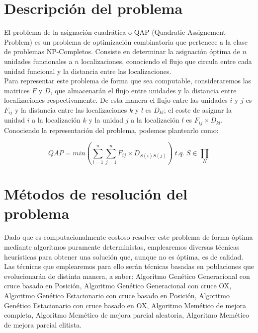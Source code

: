 \documentclass[11pt,a4paper]{article}
\begin{document}
	\newpage
	
\section{Descripción del problema}

	\noindent El problema de la asignación cuadrática o QAP (Quadratic Assignement Problem) es un problema de optimización combinatoria que pertenece a la clase de problemas NP-Completos. Consiste en determinar la asignación óptima de $n$ unidades funcionales a $n$ localizaciones, conociendo el flujo que circula entre cada unidad funcional y la distancia entre las localizaciones.\\
	
	\noindent Para representar este problema de forma que sea computable, consideraremos las matrices $F$ y $D$, que almacenarán el flujo entre unidades y la distancia entre localizaciones respectivamente. De esta manera el flujo entre las unidades $i$ y $j$ es $F_{ij}$ y la distancia entre las localizaciones $k$ y $l$ es $D_{kl}$; el coste de asignar la unidad $i$ a la localización $k$ y la unidad $j$ a la localización $l$ es $F_{ij} \times D_{kl}$.\\
	
	\noindent Conociendo la representación del problema, podemos plantearlo como:
	
	$$ QAP = min \left( \sum_{i=1}^{n}\sum_{j=1}^{n}F_{ij} \times D_{S(i)S(j)} \right)\; t.q.\; S \in \prod_{N} $$
	
\section{Métodos de resolución del problema}

	\noindent Dado que es computacionalmente costoso resolver este problema de forma óptima mediante algoritmos puramente deterministas, emplearemos diversas técnicas heurísticas para obtener una solución que, aunque no es óptima, es de calidad. Las técnicas que emplearemos para ello serán técnicas basadas en poblaciones que evolucionarán de distinta manera, a saber: Algoritmo Genético Generacional con cruce basado en Posición, Algoritmo Genético Generacional con cruce OX, Algoritmo Genético Estacionario con cruce basado en Posición, Algoritmo Genético Estacionario con cruce basado en OX, Algoritmo Memético de mejora completa, Algoritmo Memético de mejora parcial aleatoria, Algoritmo Memético de mejora parcial elitista.\\
	
\end{document}
